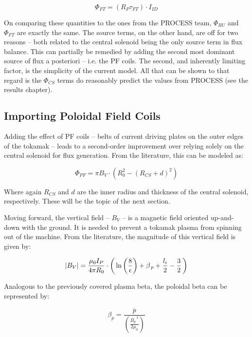 \begin{equation}
	\label{eq:phift}
	\Phi_{FT} = ( R_P \tau_{FT} ) \cdot I_{ID}
\end{equation}

On comparing these quantities to the ones from the PROCESS team, $\Phi_{RU}$ and $\Phi_{FT}$ are exactly the same. The source terms, on the other hand, are off for two reasons -- both related to the central solenoid being the only source term in flux balance. This can partially be remedied by adding the second most dominant source of flux a posteriori -- i.e. the PF coils. The second, and inherently limiting factor, is the simplicity of the current model. All that can be shown to that regard is the $\Phi_{CS}$ terms do reasonably predict the values from PROCESS (see the results chapter).

\subsection{Importing Poloidal Field Coils}

Adding the effect of PF coils -- belts of current driving plates on the outer edges of the tokamak -- leads to a second-order improvement over relying solely on the central solenoid for flux generation. From the literature, this can be modeled as:

\begin{equation}
	\label{eq:phipf}
	\Phi_{PF} = \pi B_V \cdot \left( R_0^2 - ( R_{CS} + d ) ^ 2 \right)
\end{equation}

Where again $R_{CS}$ and $d$ are the inner radius and thickness of the central solenoid, respectively. These will be the topic of the next section.

Moving forward, the vertical field -- $B_V$ -- is a magnetic field oriented up-and-down with the ground. It is needed to prevent a tokamak plasma from spinning out of the machine. From the literature, the magnitude of this vertical field is given by:

\begin{equation}
  |B_V| = \frac{\mu_0 I_P}{4 \pi R_0} \cdot \left( \,\textnormal{ln} \left(\frac{8}{\epsilon}\right) + \beta_{\,p} + \frac{l_i}{2} - \frac{3}{2} \, \right)
\end{equation} 

Analogous to the previously covered plasma beta, the poloidal beta can be represented by:

\begin{equation}
  \beta_p = \frac{\overline{p}}{\left( \frac{\overline{B_p}^{\,2}}{2 \mu_0} \right)}
\end{equation}

